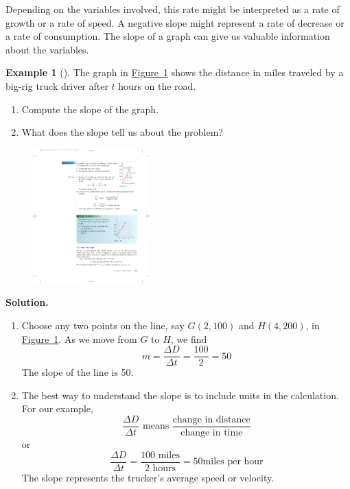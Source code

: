 \documentclass[10pt,]{book}
\theoremstyle{plain}
\theoremstyle{definition}
\theoremstyle{definition}
\theoremstyle{definition}
\newtheorem{example}[theorem]{Example}
\theoremstyle{definition}
\theoremstyle{definition}
\numberwithin{equation}{section}
\begin{document}
    Depending on the variables involved, this rate might be interpreted as a rate of growth or a rate of speed. A negative slope might represent a rate of decrease or a rate of consumption. The slope of a graph can give us valuable information about the variables.
%
\begin{example}[]\label{example-truck-speed}
The graph in \hyperref[fig-truck-speed]{Figure~\ref{fig-truck-speed}} shows the distance in miles traveled by a big-rig truck driver after \(t\) hours on the road. 
        \leavevmode%
\begin{enumerate}[label=*\alph**]
\item\hypertarget{li-145}{}Compute the slope of the graph.\item\hypertarget{li-146}{}What does the slope tell us about the problem?\end{enumerate}

\leavevmode%
\begin{figure}
\centering
\includegraphics[width=0.40\textwidth,]{images/fig-truck-speed.pdf}\caption{\label{fig-truck-speed}}
\end{figure}
\par\medskip\noindent%
\textbf{Solution.}\quad \leavevmode%
\begin{enumerate}[label=*\alph**]
\item\hypertarget{li-147}{}Choose any two points on the line, say \(G(2, 100)\) and \(H(4, 200)\), in \hyperref[fig-truck-speed]{Figure~\ref{fig-truck-speed}}. As we move from \(G\) to \(H\), we find
            \begin{equation*}m = \frac{\Delta D}{\Delta t}=\frac{100}{2}=50\end{equation*}
            The slope of the line is 50.\item\hypertarget{li-148}{}The best way to understand the slope is to include units in the calculation. For our example,
            \begin{equation*}\frac{\Delta D}{\Delta t} \text{ means } \frac{\text{change in distance}}{\text{change in time}}\end{equation*}
            or
            \begin{equation*}\frac{\Delta D}{\Delta t}
                =\frac{100 \text{ miles}}{2\text{ hours}}
                =50 \text{miles per hour}\end{equation*}
                The slope represents the trucker’s average speed or velocity.\end{enumerate}
\end{example}
\end{document}
